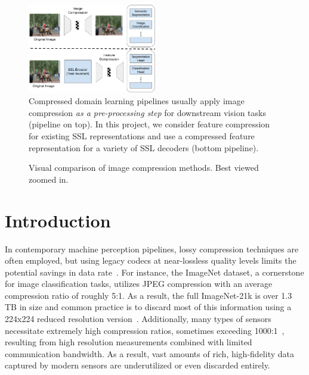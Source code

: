 \documentclass[10pt,twocolumn,letterpaper]{article}
\begin{document}
\begin{figure}[t]
\begin{center}
\includegraphics[width=0.5\textwidth]{Figures/compression-pipelines.png}
\end{center}
\caption{\label{fig:compression-pipelines}%
Compressed domain learning pipelines usually apply image compression \textit{as a pre-processing step} for downstream vision tasks (pipeline on top). In this project, we consider feature compression for existing SSL representations and use a compressed feature representation for a variety of SSL decoders (bottom pipeline).}
\end{figure}

\begin{figure}
\begin{center}
\end{center}
\caption{\label{fig:image_compression_methods}%
Visual comparison of image compression methods. Best viewed zoomed in.}
\end{figure}


\section{Introduction}

In contemporary machine perception pipelines, lossy compression techniques are often employed, but using legacy codecs at near-lossless quality levels limits the potential savings in data rate~\cite{ehrlich2022first}. For instance, the ImageNet dataset, a cornerstone for image classification tasks, utilizes JPEG compression with an average compression ratio of roughly 5:1. As a result, the full ImageNet-21k is over 1.3 TB in size and common practice is to discard most of this information using a 224x224 reduced resolution version~\cite{ridnik2021imagenet}. Additionally, many types of sensors necessitate extremely high compression ratios, sometimes exceeding 1000:1~\cite{cocker2022low}, resulting from high resolution measurements combined with limited communication bandwidth. As a result, vast amounts of rich, high-fidelity data captured by modern sensors are underutilized or even discarded entirely.
\end{document}
